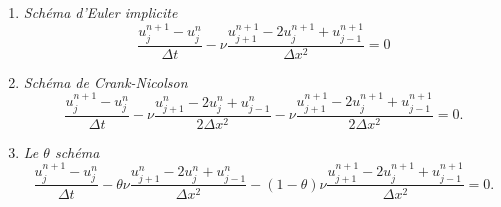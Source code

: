 \documentclass[12pt,a4paper]{article}
\begin{document}
\begin{enumerate}
\item {\it Sch\'ema d'Euler implicite}
$$
\frac{u_j^{n+1}-u_j^n}{\Delta t}-\nu \frac{u_{j+1}^{n+1}-2u_j^{n+1}+u_{j-1}^{n+1}}{\Delta x^2}=0  %
$$

\item {\it Sch\'ema de Crank-Nicolson}
$$
\frac{u_j^{n+1}-u_j^n}{\Delta t}-\nu \frac{u_{j+1}^{n}-2u_j^n+u_{j-1}^{n}}{2\Delta x^2}-\nu \frac{u_{j+1}^{n+1}-2u_j^{n+1}+u_{j-1}^{n+1}}{2\Delta x^2}=0.
$$

\item {\it Le $\theta$ sch\'ema}
$$
\frac{u_j^{n+1}-u_j^n}{\Delta t}-\theta\nu \frac{u_{j+1}^{n}-2u_j^n+u_{j-1}^{n}}{\Delta x^2}-(1-\theta)\nu \frac{u_{j+1}^{n+1}-2u_j^{n+1}+u_{j-1}^{n+1}}{\Delta x^2}=0.
$$

\end{enumerate}


\end{document}
